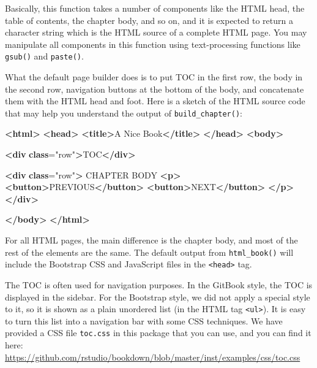 \documentclass[
  12pt,
]{krantz}
\newenvironment{Shaded}{\begin{snugshade}}{\end{snugshade}}
\newcommand{\ErrorTok}[1]{\textcolor[rgb]{0.64,0.00,0.00}{\textbf{#1}}}
\newcommand{\KeywordTok}[1]{\textcolor[rgb]{0.13,0.29,0.53}{\textbf{#1}}}
\newcommand{\NormalTok}[1]{#1}
\newcommand{\OtherTok}[1]{\textcolor[rgb]{0.56,0.35,0.01}{#1}}
\newcommand{\StringTok}[1]{\textcolor[rgb]{0.31,0.60,0.02}{#1}}
\theoremstyle{definition}
\theoremstyle{definition}
\theoremstyle{definition}
\theoremstyle{definition}
\theoremstyle{remark}
\begin{document}
Basically, this function takes a number of components like the HTML head, the table of contents, the chapter body, and so on, and it is expected to return a character string which is the HTML source of a complete HTML page. You may manipulate all components in this function using text-processing functions like \texttt{gsub()} and \texttt{paste()}.

What the default page builder does is to put TOC in the first row, the body in the second row, navigation buttons at the bottom of the body, and concatenate them with the HTML head and foot. Here is a sketch of the HTML source code that may help you understand the output of \texttt{build\_chapter()}:

\begin{Shaded}
\begin{Highlighting}[]
\KeywordTok{\textless{}html\textgreater{}}
  \KeywordTok{\textless{}head\textgreater{}}
    \KeywordTok{\textless{}title\textgreater{}}\NormalTok{A Nice Book}\KeywordTok{\textless{}/title\textgreater{}}
  \KeywordTok{\textless{}/head\textgreater{}}
  \KeywordTok{\textless{}body\textgreater{}}
  
    \KeywordTok{\textless{}div} \ErrorTok{class}\OtherTok{=}\StringTok{"row"}\KeywordTok{\textgreater{}}\NormalTok{TOC}\KeywordTok{\textless{}/div\textgreater{}}
    
    \KeywordTok{\textless{}div} \ErrorTok{class}\OtherTok{=}\StringTok{"row"}\KeywordTok{\textgreater{}}
\NormalTok{      CHAPTER BODY}
      \KeywordTok{\textless{}p\textgreater{}}
        \KeywordTok{\textless{}button\textgreater{}}\NormalTok{PREVIOUS}\KeywordTok{\textless{}/button\textgreater{}}
        \KeywordTok{\textless{}button\textgreater{}}\NormalTok{NEXT}\KeywordTok{\textless{}/button\textgreater{}}
      \KeywordTok{\textless{}/p\textgreater{}}
    \KeywordTok{\textless{}/div\textgreater{}}
  
  \KeywordTok{\textless{}/body\textgreater{}}
\KeywordTok{\textless{}/html\textgreater{}}
\end{Highlighting}
\end{Shaded}

For all HTML pages, the main difference is the chapter body, and most of the rest of the elements are the same. The default output from \texttt{html\_book()} will include the Bootstrap CSS and JavaScript files in the \texttt{\textless{}head\textgreater{}} tag.

The TOC is often used for navigation purposes. In the GitBook style, the TOC is displayed in the sidebar. For the Bootstrap style, we did not apply a special style to it, so it is shown as a plain unordered list (in the HTML tag \texttt{\textless{}ul\textgreater{}}). It is easy to turn this list into a navigation bar with some CSS techniques. We have provided a CSS file \texttt{toc.css} in this package that you can use, and you can find it here: \url{https://github.com/rstudio/bookdown/blob/master/inst/examples/css/toc.css}
\end{document}
